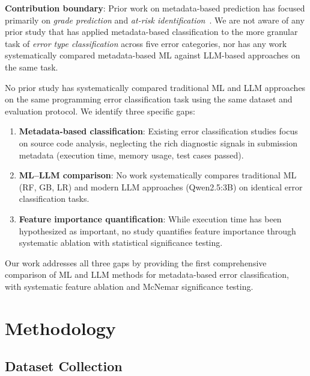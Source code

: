 \documentclass[acmsmall]{acmart}
\begin{document}
\noindent\textbf{Contribution boundary}: Prior work on metadata-based prediction
has focused primarily on \textit{grade prediction} and \textit{at-risk
identification}~\cite{wang2017learning,pears2007survey}. We are not aware of
any prior study that has applied metadata-based classification to the more
granular task of \textit{error type classification} across five error
categories, nor has any work systematically compared metadata-based ML against
LLM-based approaches on the same task.

No prior study has systematically compared traditional ML and
LLM approaches on the same programming error classification task using the
same dataset and evaluation protocol. We identify three specific gaps:

\begin{enumerate}
    \item \textbf{Metadata-based classification}: Existing error classification
          studies focus on source code analysis, neglecting the rich diagnostic
          signals in submission metadata (execution time, memory usage, test cases
          passed).
    \item \textbf{ML--LLM comparison}: No work systematically compares traditional
          ML (RF, GB, LR) and modern LLM approaches (Qwen2.5:3B)
          on identical error classification tasks.
    \item \textbf{Feature importance quantification}: While execution time has been
          hypothesized as important, no study quantifies feature importance through
          systematic ablation with statistical significance testing.
\end{enumerate}

Our work addresses all three gaps by providing the first comprehensive comparison
of ML and LLM methods for metadata-based error classification, with systematic
feature ablation and McNemar significance testing.

\section{Methodology}

\subsection{Dataset Collection}
\end{document}
